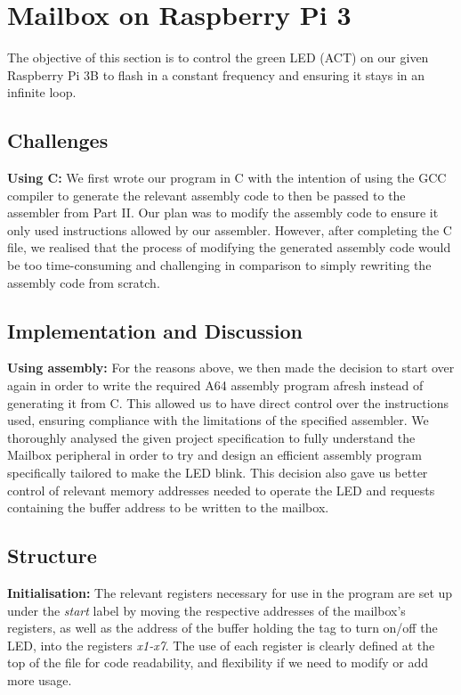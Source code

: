 \documentclass{article}
\begin{document}
    
    \section{Mailbox on Raspberry Pi 3}

        The objective of this section is to control the green LED (ACT) on our given Raspberry Pi 3B to flash in a constant frequency and ensuring it stays in an infinite loop.
        
        \begin{adjustwidth}{2em}{0pt}
        \subsection{Challenges}
        \textbf{Using C: }We first wrote our program in C with the intention of using the GCC compiler to generate the relevant assembly code to then be passed to the assembler from Part II. Our plan was to modify the assembly code to ensure it only used instructions allowed by our assembler. However, after completing the C file, we realised that the process of modifying the generated assembly code would be too time-consuming and challenging in comparison to simply rewriting the assembly code from scratch.
        \subsection{Implementation and Discussion} 
         
            
            \textbf{Using assembly: }For the reasons above, we then made the decision to start over again in order to write the required A64 assembly program afresh instead of generating it from C. This allowed us to have direct control over the instructions used, ensuring compliance with the limitations of the specified assembler. We thoroughly analysed the given project specification to fully understand the Mailbox peripheral in order to try and design an efficient assembly program specifically tailored to make the LED blink. This decision also gave us better control of relevant memory addresses needed to operate the LED and requests containing the buffer address to be written to the mailbox.
    
        \subsection{Structure}
        
            \textbf{Initialisation: }The relevant registers necessary for use in the program are set up under the \textit{start} label by moving the respective addresses of the mailbox's registers, as well as the address of the buffer holding the tag to turn on/off the LED, into the registers \textit{x1-x7}. The use of each register is clearly defined at the top of the file for code readability, and flexibility if we need to modify or add more usage.
            

\end{adjustwidth}
\end{document}
